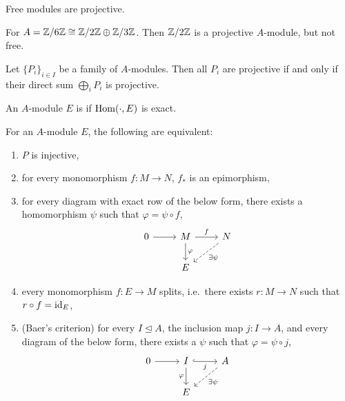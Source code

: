 \begin{example}
  Free modules are projective.
\end{example}

\begin{example}
  For $A = \mathbb{Z} / 6 \mathbb{Z} \cong \mathbb{Z} / 2 \mathbb{Z} \oplus \mathbb{Z} / 3 \mathbb{Z}$.
  Then $\mathbb{Z} / 2 \mathbb{Z}$ is a projective $A$-module, but not free.
\end{example}

\begin{corollary}
  Let $\{P_i\}_{i \in I}$ be a family of $A$-modules.
  Then all $P_i$ are projective if and only if their direct sum $\bigoplus_i
  P_i$ is projective.
\end{corollary}

\begin{definition}
  An $A$-module $E$ is  if $\operatorname{Hom}(\cdot, E)$ is exact.
\end{definition}

\begin{theorem}
  For an $A$-module $E$, the following are equivalent:
  \begin{enumerate}
  \item $P$ is injective,
  \item for every monomorphism $f: M \to N$, $f_*$ is an epimorphism,
  \item for every diagram with exact row of the below form, there exists a
	homomorphism $\psi$ such that $\varphi = \psi \circ f$,
	\[\begin{tikzcd}
		0 & M & N \\
		& E
		\arrow[from=1-1, to=1-2]
		\arrow["f", from=1-2, to=1-3]
		\arrow["\varphi", from=1-2, to=2-2]
		\arrow["\exists \psi", dashed, from=1-3, to=2-2]
	  \end{tikzcd}\]
  \item every monomorphism $f: E \to M$ splits, i.e.~there exists $r: M \to N$
	such that $r \circ f = \operatorname{id}_E$,
  \item (Baer's criterion) for every $I \trianglelefteq A$, the inclusion map
	$j: I \to A$, and every diagram of the below form, there exists a $\psi$
	such that $\varphi = \psi \circ j$,
	\[\begin{tikzcd}
		0 & I & A \\
		& E
		\arrow[from=1-1, to=1-2]
		\arrow["j"', hook, from=1-2, to=1-3]
		\arrow["\varphi"', from=1-2, to=2-2]
		\arrow["{\exists \psi}", dashed, from=1-3, to=2-2]
	  \end{tikzcd}\]
  \end{enumerate}
\end{theorem}

